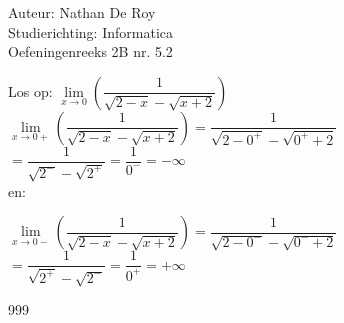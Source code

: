 \documentclass[a4paper]{article}
\begin{document}
  
\noindent \large Auteur: Nathan De Roy \\
\noindent \large Studierichting: Informatica\\
\noindent \large Oefeningenreeks 2B nr. 5.2\\

\medskip

\normalsize

Los op: $\lim\limits_{x \to 0}\left(\dfrac{1}{\sqrt{2-x}-\sqrt{x+2}}\right)$\\

$\lim\limits_{x \to 0+}\left(\dfrac{1}{\sqrt{2-x}-\sqrt{x+2}}\right) = \dfrac{1}{\sqrt{2-0^+}-\sqrt{0^++2}}$\\

$= \dfrac{1}{\sqrt{2^-}-\sqrt{2^+}} = \dfrac{1}{0^-} = -\infty$\\

en:

$\lim\limits_{x \to 0-}\left(\dfrac{1}{\sqrt{2-x}-\sqrt{x+2}}\right) = \dfrac{1}{\sqrt{2-0^-}-\sqrt{0^-+2}}$\\

$= \dfrac{1}{\sqrt{2^+}-\sqrt{2^-}} = \dfrac{1}{0^+} = +\infty$\\

\begin{thebibliography}{999}
\end{thebibliography}
\end{document}
